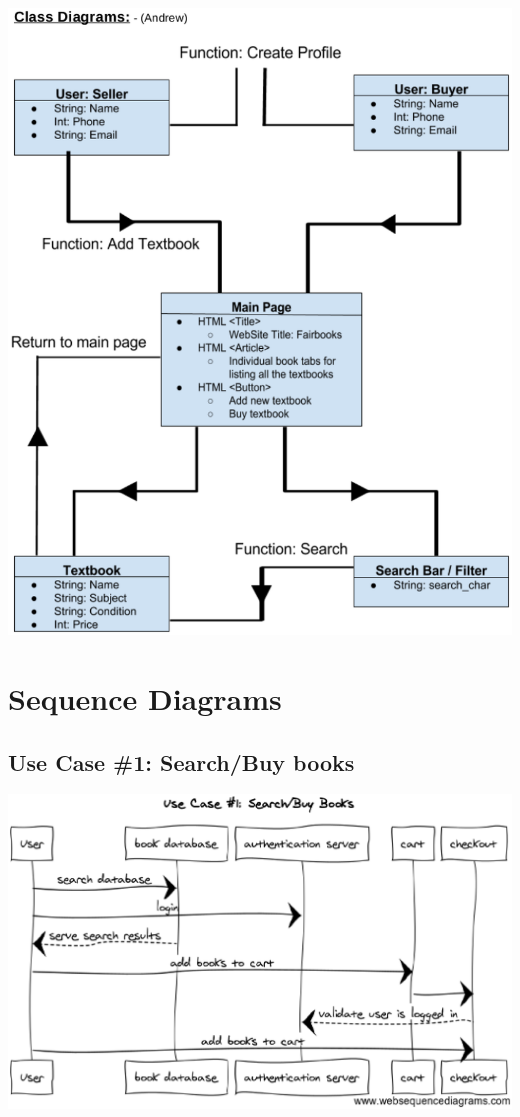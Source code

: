 \documentclass[12pt]{article}
\begin{document}
	\includegraphics[width=16cm]{class_diagrams.eps}


	\section{Sequence Diagrams}

		\subsection{Use Case \#1: Search/Buy books}
		\includegraphics[width=14cm]{sequence_diagram1.eps}
\end{document}
